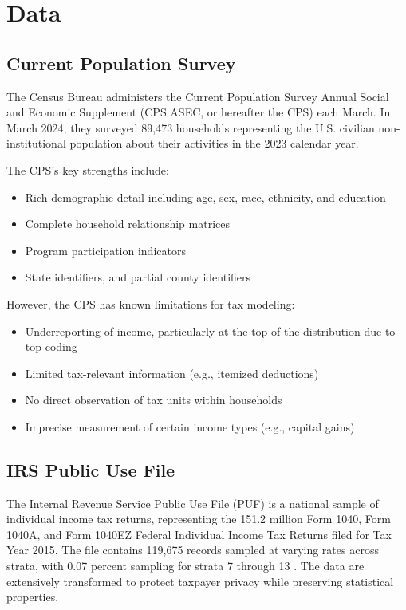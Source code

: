 \section{Data}\label{sec:data}

\subsection{Current Population Survey}

The Census Bureau administers the Current Population Survey Annual Social and Economic Supplement (CPS ASEC, or hereafter the CPS) each March. In March 2024, they surveyed 89,473 households representing the U.S. civilian non-institutional population about their activities in the 2023 calendar year.

The CPS's key strengths include:
\begin{itemize}
    \item Rich demographic detail including age, sex, race, ethnicity, and education
    \item Complete household relationship matrices
    \item Program participation indicators
    \item State identifiers, and partial county identifiers
\end{itemize}

However, the CPS has known limitations for tax modeling:
\begin{itemize}
    \item Underreporting of income, particularly at the top of the distribution due to top-coding
    \item Limited tax-relevant information (e.g., itemized deductions)
    \item No direct observation of tax units within households
    \item Imprecise measurement of certain income types (e.g., capital gains)
\end{itemize}

\subsection{IRS Public Use File}

The Internal Revenue Service Public Use File (PUF) is a national sample of individual income tax returns, representing the 151.2 million Form 1040, Form 1040A, and Form 1040EZ Federal Individual Income Tax Returns filed for Tax Year 2015. The file contains 119,675 records sampled at varying rates across strata, with 0.07 percent sampling for strata 7 through 13 \cite{bryant2023b}. The data are extensively transformed to protect taxpayer privacy while preserving statistical properties.

